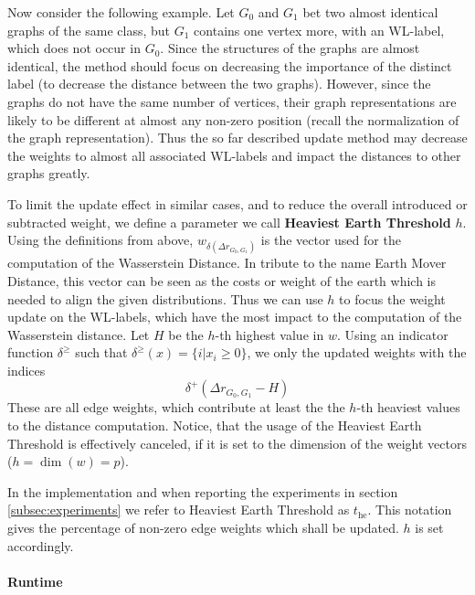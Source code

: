 	Now consider the following example.
	Let $G_0$ and $G_1$ bet two almost identical graphs of the same class, but $G_1$ contains one vertex more, with an WL-label, which does not occur in $G_0$.
	Since the structures of the graphs are almost identical, the method should focus on decreasing the importance of the distinct label (to decrease the distance between the two graphs).
	However, since the graphs do not have the same number of vertices, their graph representations are likely to be different at almost any non-zero position (recall the normalization of the graph representation).
	Thus the so far described update method may decrease the weights to almost all associated WL-labels and impact the distances to other graphs greatly.
	
	To limit the update effect in similar cases, and to reduce the overall introduced or subtracted weight, we define a parameter we call \textbf{Heaviest Earth Threshold} $h$.
	Using the definitions from above, ${w}_{\delta(\Delta r_{G_0, G_1})}$ is the vector used for the computation of the Wasserstein Distance.
	In tribute to the name Earth Mover Distance, this vector can be seen as the costs or weight of the earth which is needed to align the given distributions.
	Thus we can use $h$ to focus the weight update on the WL-labels, which have the most impact to the computation of the Wasserstein distance.
	Let $H$ be the $h$-th highest value in $w$.	
	Using an indicator function $\delta^\ge$ such that $\delta^\ge(x)=\{i| x_i\ge0 \}$, we only the updated weights with the indices
	\[ \delta^+(\Delta r_{G_0, G_1}-H ) \]
	These are all edge weights, which contribute at least the the $h$-th heaviest values to the distance computation.
	Notice, that the usage of the Heaviest Earth Threshold is effectively canceled, if it is set to the dimension of the weight vectors ($h=\dim(w) = p$).
	
	In the implementation and when reporting the experiments in section \ref{subsec:experiments} we refer to Heaviest Earth Threshold as $t_{\text{he}}$.
	This notation gives the percentage of non-zero edge weights which shall be updated.
	$h$ is set accordingly.
		
	\paragraph{Runtime}
	
